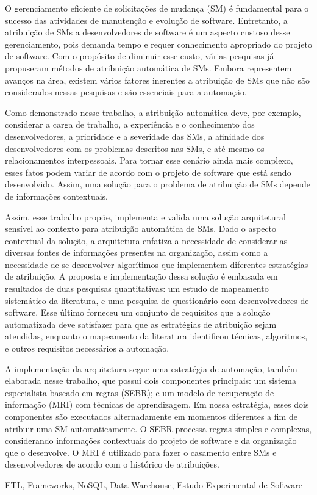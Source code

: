 O gerenciamento eficiente de solicitações de mudança (SM) é fundamental para o
sucesso das atividades de manutenção e evolução de software. Entretanto, a
atribuição de SMs a desenvolvedores de software é um aspecto custoso desse
gerenciamento, pois demanda tempo e requer conhecimento apropriado do projeto de
software. Com o propósito de diminuir esse custo, várias pesquisas já propuseram
métodos de atribuição automática de SMs. Embora representem avanços na área,
existem vários fatores inerentes a atribuição de SMs que não são considerados
nessas pesquisas e são essenciais para a automação.

Como demonstrado nesse trabalho, a atribuição automática deve, por exemplo,
considerar a carga de trabalho, a experiência e o conhecimento dos
desenvolvedores, a prioridade e a severidade das SMs, a afinidade dos
desenvolvedores com os problemas descritos nas SMs, e até mesmo os
relacionamentos interpessoais. Para tornar esse cenário ainda mais complexo,
esses fatos podem variar de acordo com o projeto de software que está sendo
desenvolvido. Assim, uma solução para o problema de atribuição de SMs depende de
informações contextuais.

Assim, esse trabalho propõe, implementa e valida uma solução arquitetural
sensível ao contexto para atribuição automática de SMs. Dado o aspecto
contextual da solução, a arquitetura enfatiza a necessidade de considerar as
diversas fontes de informações presentes na organização, assim como a
necessidade de se desenvolver algorítimos que implementem diferentes estratégias
de atribuição. A proposta e implementação dessa solução é embasada em resultados
de duas pesquisas quantitativas: um estudo de mapeamento sistemático da
literatura, e uma pesquisa de questionário com desenvolvedores de software. Esse
último forneceu um conjunto de requisitos que a solução automatizada deve
satisfazer para que as estratégias de atribuição sejam atendidas, enquanto o
mapeamento da literatura identificou técnicas, algoritmos, e outros requisitos
necessários a automação.

A implementação da arquitetura segue uma estratégia de automação, também
elabo\-rada nesse trabalho, que possui dois componentes principais: um sistema
especialista baseado em regras (SEBR); e um modelo de recuperação de informação
(MRI) com técnicas de aprendizagem. Em nossa estratégia, esses dois componentes
são executados alternadamente em momentos diferentes a fim de atribuir uma SM
automaticamente. O SEBR processa regras simples e complexas, considerando
informações contextuais do projeto de software e da organização que o
desenvolve. O MRI é utilizado para fazer o casamento entre SMs e desenvolvedores
de acordo com o histórico de atribuições.

\begin{keywords}
ETL, Frameworks, NoSQL, Data Warehouse, Estudo Experimental de Software
\end{keywords}